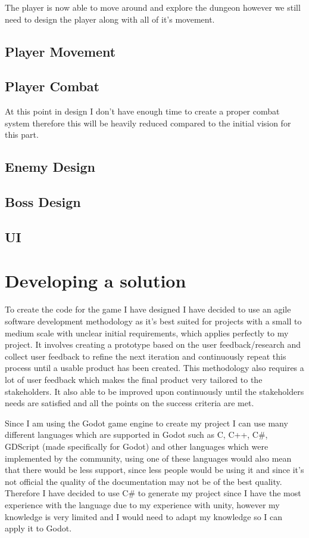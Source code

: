 \documentclass{article}
\newcommand{\parBr}{\vspace{5mm}}%
\begin{document}
The player is now able to move around and explore the dungeon however we still need to design the player along with all of it's movement.

\subsection{Player Movement}

\subsection{Player Combat}
At this point in design I don't have enough time to create a proper combat system therefore this will be heavily reduced compared to the initial vision for this part.

\subsection{Enemy Design}

\subsection{Boss Design}

\subsection{UI}

\section{Developing a solution}
To create the code for the game I have designed I have decided to use an agile software development methodology as it's best suited for projects with a small to medium scale with unclear initial requirements, which applies perfectly to my project. It involves creating a prototype based on the user feedback/research and collect user feedback to refine the next iteration and continuously repeat this process until a usable product has been created. This methodology also requires a lot of user feedback which makes the final product very tailored to the stakeholders. It also able to be improved upon continuously until the stakeholders needs are satisfied and all the points on the success criteria are met.

\parBr

Since I am using the Godot game engine to create my project I can use many different languages which are supported in Godot such as C, C++, C\#, GDScript (made specifically for Godot) and other languages which were implemented by the community, using one of these languages would also mean that there would be less support, since less people would be using it and since it's not official the quality of the documentation may not be of the best quality. Therefore I have decided to use C\# to generate my project since I have the most experience with the language due to my experience with unity, however my knowledge is very limited and I would need to adapt my knowledge so I can apply it to Godot. 
\end{document}
